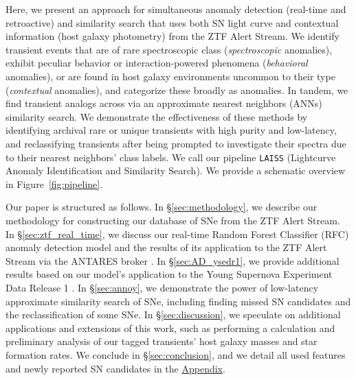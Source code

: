 \documentclass[twocolumn]{aastex63}
\newcommand{\laiss}{\texttt{LAISS}}
\begin{document}
Here, we present an approach for simultaneous anomaly detection (real-time and retroactive) and similarity search that uses both SN light curve and contextual information (host galaxy photometry) from the ZTF Alert Stream. We identify transient events that are of rare spectroscopic class (\emph{spectroscopic} anomalies), exhibit peculiar behavior or interaction-powered phenomena (\emph{behavioral} anomalies), or are found in host galaxy environments uncommon to their type (\emph{contextual} anomalies), and categorize these broadly as anomalies. In tandem, we find transient analogs across via an approximate nearest neighbors (ANNs) similarity search. We demonstrate the effectiveness of these methods by identifying archival rare or unique transients with high purity and low-latency, and reclassifying transients after being prompted to investigate their spectra due to their nearest neighbors' class labels. We call our pipeline \laiss{} (Lightcurve Anomaly Identification and Similarity Search). We provide a schematic overview in Figure~\ref{fig:pipeline}. \par

Our paper is structured as follows. In \S\ref{sec:methodology}, we describe our methodology for constructing our database of SNe from the ZTF Alert Stream. In \S\ref{sec:ztf_real_time}, we discuss our real-time Random Forest Classifier (RFC) anomaly detection model and the results of its application to the ZTF Alert Stream via the ANTARES broker \citep{Matheson2021}. In \S\ref{sec:AD_ysedr1}, we provide additional results based on our model's application to the Young Supernova Experiment Data Release 1 \citep[YSE DR1;][]{Aleo2023}. In \S\ref{sec:annoy}, we demonstrate the power of low-latency approximate similarity search of SNe, including finding missed SN candidates and the reclassification of some SNe. In \S\ref{sec:discussion}, we speculate on additional applications and extensions of this work, such as performing a calculation and preliminary analysis of our tagged transients' host galaxy masses and star formation rates. We conclude in \S\ref{sec:conclusion}, and we detail all used features and newly reported SN candidates in the \hyperref[sec:appendix]{Appendix}. \par
\end{document}
